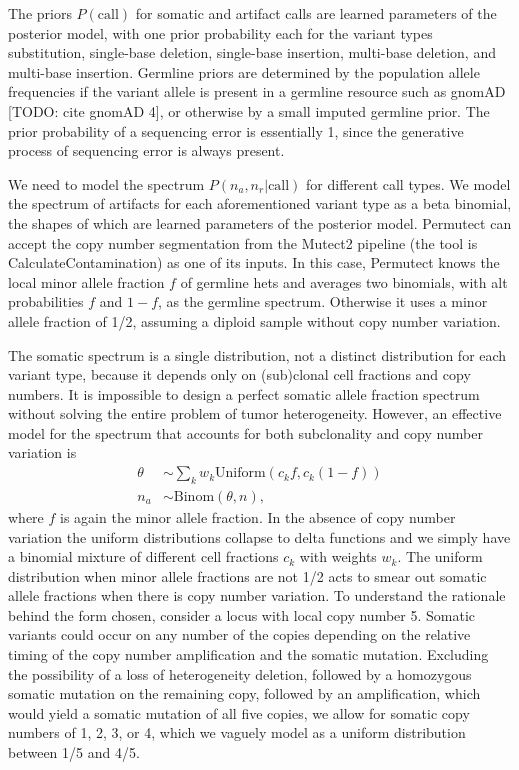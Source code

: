 \documentclass[times, twoside, watermark]{StyleBioRxiv}
\begin{document}
The priors $P(\mathrm{call})$ for somatic and artifact calls are learned parameters of the posterior model, with one prior probability each for the variant types substitution, single-base deletion, single-base insertion, multi-base deletion, and multi-base insertion.  Germline priors are determined by the population allele frequencies if the variant allele is present in a germline resource such as gnomAD [TODO: cite gnomAD 4], or otherwise by a small imputed germline prior.  The prior probability of a sequencing error is essentially 1, since the generative process of sequencing error is always present.

We need to model the spectrum $P(n_a, n_r | \mathrm{call})$ for different call types.  We model the spectrum of artifacts for each aforementioned variant type as a beta binomial, the shapes of which are learned parameters of the posterior model.  Permutect can accept the copy number segmentation from the Mutect2 pipeline (the tool is CalculateContamination) as one of its inputs.  In this case, Permutect knows the local minor allele fraction $f$ of germline hets and averages two binomials, with alt probabilities $f$ and $1-f$, as the germline spectrum.  Otherwise it uses a minor allele fraction of 1/2, assuming a diploid sample without copy number variation.

The somatic spectrum is a single distribution, not a distinct distribution for each variant type, because it depends only on (sub)clonal cell fractions and copy numbers.  It is impossible to design a perfect somatic allele fraction spectrum without solving the entire problem of tumor heterogeneity.  However, an effective model for the spectrum that accounts for both subclonality and copy number variation is
\begin{align}
    \theta &\sim \sum_k w_k \mathrm{Uniform}(c_k f, c_k (1-f)) \\
    n_a &\sim \mathrm{Binom}(\theta, n),
\end{align}
where $f$ is again the minor allele fraction.  In the absence of copy number variation the uniform distributions collapse to delta functions and we simply have a binomial mixture of different cell fractions $c_k$ with weights $w_k$.  The uniform distribution when minor allele fractions are not 1/2 acts to smear out somatic allele fractions when there is copy number variation.  To understand the rationale behind the form chosen, consider a locus with local copy number 5.  Somatic variants could occur on any number of the copies depending on the relative timing of the copy number amplification and the somatic mutation.  Excluding the possibility of a loss of heterogeneity deletion, followed by a homozygous somatic mutation on the remaining copy, followed by an amplification, which would yield a somatic mutation of all five copies, we allow for somatic copy numbers of 1, 2, 3, or 4, which we vaguely model as a uniform distribution between 1/5 and 4/5.
\end{document}
